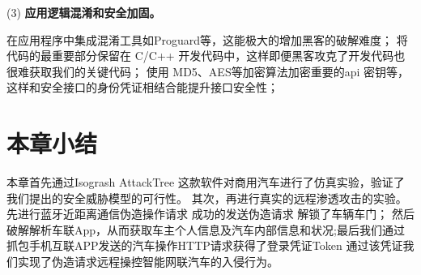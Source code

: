 (3) \textbf{应用逻辑混淆和安全加固。} 

在应用程序中集成混淆工具如Proguard等，这能极大的增加黑客的破解难度；
将代码的最重要部分保留在 C/C++ 开发代码中，这样即便黑客攻克了开发代码也很难获取我们的关键代码；
使用 MD5、AES等加密算法加密重要的api 密钥等，这样和安全接口的身份凭证相结合能提升接口安全性；

\section{本章小结}
本章首先通过Isogrash AttackTree 这款软件对商用汽车进行了仿真实验，验证了我们提出的安全威胁模型的可行性。
其次，再进行真实的远程渗透攻击的实验。先进行蓝牙近距离通信伪造操作请求 成功的发送伪造请求 解锁了车辆车门；
然后破解解析车联App，从而获取车主个人信息及汽车内部信息和状况;最后我们通过抓包手机互联APP发送的汽车操作HTTP请求获得了登录凭证Token
通过该凭证我们实现了伪造请求远程操控智能网联汽车的入侵行为。
